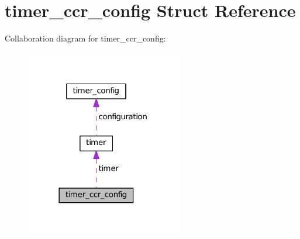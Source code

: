 \hypertarget{structtimer__ccr__config}{}\section{timer\+\_\+ccr\+\_\+config Struct Reference}
\label{structtimer__ccr__config}


Collaboration diagram for timer\+\_\+ccr\+\_\+config\+:\nopagebreak
\begin{figure}[H]
\begin{center}
\leavevmode
\includegraphics[width=194pt]{structtimer__ccr__config__coll__graph}
\end{center}
\end{figure}
